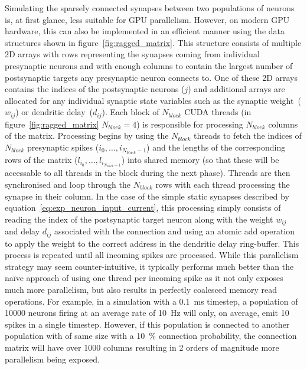 \documentclass[utf8]{frontiersSCNS} %
\begin{document}
Simulating the sparsely connected synapses between two populations of neurons is, at first glance, less suitable for GPU parallelism.
However, on modern GPU hardware, this can also be implemented in an efficient manner using the data structures shown in figure~\ref{fig:ragged_matrix}.
This structure consists of multiple 2D arrays with rows representing the synapses coming from individual presynaptic neurons and with enough columns to contain the largest number of postsynaptic targets any presynaptic neuron connects to.
One of these 2D arrays contains the indices of the postsynaptic neurons ($j$) and additional arrays are allocated for any individual synaptic state variables such as the synaptic weight~($w_{ij}$) or dendritic delay~($d_{ij}$).
Each block of $N_{block}$ CUDA threads (in figure~\ref{fig:ragged_matrix} $N_{block}=4$) is responsible for processing $N_{block}$ columns of the matrix.
Processing begins by using the $N_{block}$ threads to fetch the indices of $N_{block}$ presynaptic spikes ($i_{0},\ldots,i_{N_{block} - 1}$) and the lengths of the corresponding rows of the matrix ($l_{i_{0}},\ldots,l_{i_{N_{block} - 1}}$) into shared memory (so that these will be accessable to all threads in the block during the next phase).
Threads are then synchronised and loop through the $N_{block}$ rows with each thread processing the synapse in their column.
In the case of the simple static synapses described by equation~\ref{eq:exp_neuron_input_current}, this processing simply consists of reading the index of the postsynaptic target neuron along with the weight $w_{ij}$ and delay $d_{ij}$ associated with the connection and using an atomic add operation to apply the weight to the correct address in the dendritic delay ring-buffer.
This process is repeated until all incoming spikes are processed.
While this parallelism strategy may seem counter-intuitive, it typically performs much better than the naïve approach of using one thread per incoming spike as it not only exposes much more parallelism, but also results in perfectly coalesced memory read operations.
For example, in a simulation with a \SI{0.1}{\milli\second} timestep, a population of \num{10000} neurons firing at an average rate of \SI{10}{\hertz} will only, on average, emit \num{10} spikes in a single timestep.
However, if this population is connected to another population with of same size with a \SI{10}{\percent} connection probability, the connection matrix will have over \num{1000} columns resulting in 2 orders of magnitude more parallelism being exposed.
\end{document}
